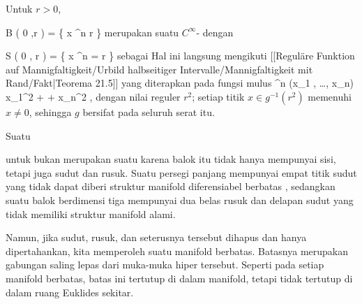 {

Untuk $r>0$, 

\mavergleichskettedisp
{\vergleichskette
{ B  \left(  0 ,r \right)
}
{ =} { \left\{  x \in \R^n   \mid   {} \leq r         \right\}
}
{ } {
}
{ } {
}
{ } {
}
}
{}{}{}
merupakan suatu
$C^\infty$-
dengan  {}

\mavergleichskettedisp
{\vergleichskette
{ S \left(   0 , r  \right)
}
{ =} { \left\{  x \in \R^n   \mid   {} =  r         \right\}
}
{ } {
}
{ } {
}
{ } {
}
}
{}{}{}
sebagai
Hal ini langsung mengikuti
[[Reguläre Funktion auf Mannigfaltigkeit/Urbild halbseitiger Intervalle/Mannigfaltigkeit mit Rand/Fakt|Teorema 21.5]]
yang diterapkan pada fungsi mulus
 {\R^n } {\R
} {(x_1 , \ldots , x_n) } { x_1^2 + \cdots + x_n^2
} {,}
dengan nilai reguler $r^2$; setiap titik $x\in g^{-1}(r^2)$ memenuhi
$x\neq 0$, sehingga $g$ bersifat
 pada seluruh serat itu.

}

{

Suatu
 

 {  }

untuk
 bukan merupakan suatu
karena balok itu tidak hanya mempunyai sisi, tetapi juga
 {} {}
sudut dan rusuk. Suatu persegi panjang mempunyai empat titik sudut yang tidak dapat diberi struktur manifold diferensiabel berbatas
 {} {}
 {} {,}
sedangkan suatu balok berdimensi tiga mempunyai dua belas rusuk dan delapan sudut yang tidak memiliki struktur manifold alami.

Namun, jika sudut, rusuk, dan seterusnya tersebut dihapus dan hanya  dipertahankan, kita memperoleh suatu
 {} {}
manifold berbatas. Batasnya merupakan gabungan saling lepas dari muka-muka hiper tersebut. Seperti pada setiap manifold berbatas, batas ini tertutup di dalam manifold, tetapi tidak tertutup di dalam ruang Euklides sekitar.

}

